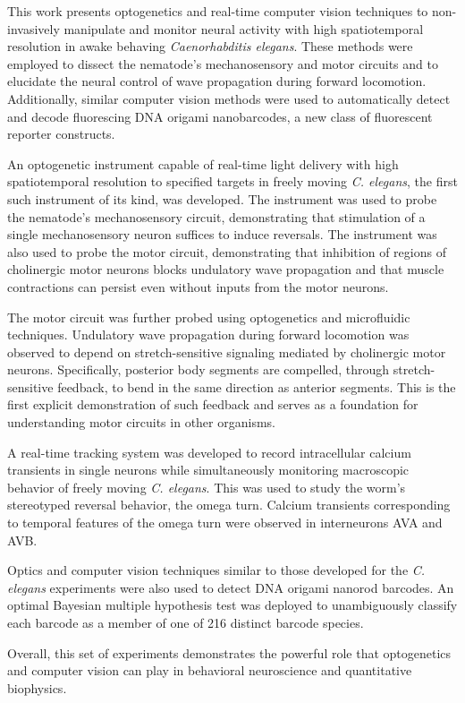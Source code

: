 





This work presents optogenetics and real-time computer vision techniques to non-invasively manipulate and monitor neural activity with high spatiotemporal resolution in awake behaving \textit{Caenorhabditis elegans}. These methods were employed to dissect the nematode's mechanosensory and motor circuits and to elucidate the neural control of wave propagation during forward locomotion.  Additionally, similar computer vision methods were used to automatically detect and decode fluorescing DNA origami nanobarcodes, a new class of fluorescent reporter constructs.

An optogenetic instrument capable of real-time light delivery with high spatiotemporal resolution to specified targets in freely moving \textit{C. elegans}, the first such instrument of its kind, was developed. The instrument was used to probe the nematode's mechanosensory circuit, demonstrating that stimulation of a single mechanosensory neuron suffices to induce reversals. The instrument was also used to probe the motor circuit, demonstrating that inhibition of regions of cholinergic motor neurons blocks undulatory wave propagation and that muscle contractions can persist even without inputs from the motor neurons.

The motor circuit was further probed using optogenetics and microfluidic techniques. Undulatory wave propagation during forward locomotion was observed to depend on stretch-sensitive signaling mediated by cholinergic motor neurons. Specifically, posterior body segments are compelled, through stretch-sensitive feedback, to bend in the same
direction as anterior segments. This is the first explicit demonstration of such feedback and serves as a foundation for understanding motor circuits in other organisms. 

A real-time tracking system was developed to record intracellular calcium transients in single neurons while simultaneously monitoring macroscopic behavior of freely moving \textit{C. elegans}. This was used to study the worm's stereotyped reversal behavior, the omega turn. Calcium transients corresponding to temporal features of the omega turn were observed in interneurons AVA and AVB.

Optics and computer vision techniques similar to those developed for the \textit{C. elegans} experiments were also used to detect DNA origami nanorod barcodes. An optimal Bayesian multiple hypothesis test was deployed to unambiguously classify each barcode as a member of one of 216 distinct barcode species.

Overall, this set of experiments demonstrates the powerful role that optogenetics and computer vision can play in behavioral neuroscience and quantitative biophysics.